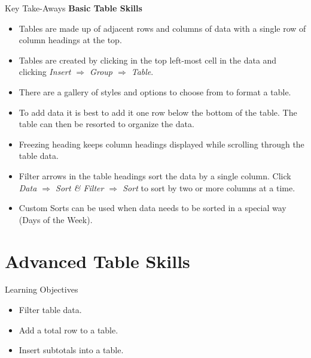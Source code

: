 \begin{center}
	\begin{tkwbox}{Key Take-Aways}
		\textbf{Basic Table Skills}
		\\
		\begin{itemize}
			\setlength{\itemsep}{0pt}
			\setlength{\parskip}{0pt}
			\setlength{\parsep}{0pt}

			\item Tables are made up of adjacent rows and columns of data with a single row of column headings at the top.
			\item Tables are created by clicking in the top left-most cell in the data and clicking \textit{Insert $ \Rightarrow $ Group $ \Rightarrow $ Table}.
			\item There are a gallery of styles and options to choose from to format a table.
			\item To add data it is best to add it one row below the bottom of the table. The table can then be resorted to organize the data.
			\item Freezing heading keeps column headings displayed while scrolling through the table data.
			\item Filter arrows in the table headings sort the data by a single column. Click \textit{Data $ \Rightarrow $ Sort \& Filter $ \Rightarrow $ Sort} to sort by two or more columns at a time.
			\item Custom Sorts can be used when data needs to be sorted in a special way (\ie Days of the Week).
			
		\end{itemize}
	\end{tkwbox}
\end{center}

\section{Advanced Table Skills}

\begin{center}
	\begin{objbox}{Learning Objectives}
		\begin{itemize}
			\setlength{\itemsep}{0pt}
			\setlength{\parskip}{0pt}
			\setlength{\parsep}{0pt}

			\item Filter table data.
			\item Add a total row to a table.
			\item Insert subtotals into a table.
			
		\end{itemize}
	\end{objbox}
\end{center}


